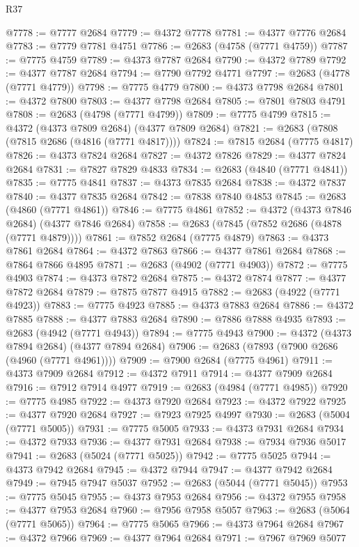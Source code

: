 \begin{lexlean}{R37}
\begin{coremodule}
@7778 := @7777 @2684
@7779 := @4372 @7778
@7781 := @4377 @7776 @2684
@7783 := @7779 @7781 @4751
@7786 := @2683 (@4758 (@7771 @4759))
@7787 := @7775 @4759
@7789 := @4373 @7787 @2684
@7790 := @4372 @7789
@7792 := @4377 @7787 @2684
@7794 := @7790 @7792 @4771
@7797 := @2683 (@4778 (@7771 @4779))
@7798 := @7775 @4779
@7800 := @4373 @7798 @2684
@7801 := @4372 @7800
@7803 := @4377 @7798 @2684
@7805 := @7801 @7803 @4791
@7808 := @2683 (@4798 (@7771 @4799))
@7809 := @7775 @4799
@7815 := @4372 (@4373 @7809 @2684) (@4377 @7809 @2684)
@7821 := @2683 (@7808 (@7815 @2686 (@4816 (@7771 @4817))))
@7824 := @7815 @2684 (@7775 @4817)
@7826 := @4373 @7824 @2684
@7827 := @4372 @7826
@7829 := @4377 @7824 @2684
@7831 := @7827 @7829 @4833
@7834 := @2683 (@4840 (@7771 @4841))
@7835 := @7775 @4841
@7837 := @4373 @7835 @2684
@7838 := @4372 @7837
@7840 := @4377 @7835 @2684
@7842 := @7838 @7840 @4853
@7845 := @2683 (@4860 (@7771 @4861))
@7846 := @7775 @4861
@7852 := @4372 (@4373 @7846 @2684) (@4377 @7846 @2684)
@7858 := @2683 (@7845 (@7852 @2686 (@4878 (@7771 @4879))))
@7861 := @7852 @2684 (@7775 @4879)
@7863 := @4373 @7861 @2684
@7864 := @4372 @7863
@7866 := @4377 @7861 @2684
@7868 := @7864 @7866 @4895
@7871 := @2683 (@4902 (@7771 @4903))
@7872 := @7775 @4903
@7874 := @4373 @7872 @2684
@7875 := @4372 @7874
@7877 := @4377 @7872 @2684
@7879 := @7875 @7877 @4915
@7882 := @2683 (@4922 (@7771 @4923))
@7883 := @7775 @4923
@7885 := @4373 @7883 @2684
@7886 := @4372 @7885
@7888 := @4377 @7883 @2684
@7890 := @7886 @7888 @4935
@7893 := @2683 (@4942 (@7771 @4943))
@7894 := @7775 @4943
@7900 := @4372 (@4373 @7894 @2684) (@4377 @7894 @2684)
@7906 := @2683 (@7893 (@7900 @2686 (@4960 (@7771 @4961))))
@7909 := @7900 @2684 (@7775 @4961)
@7911 := @4373 @7909 @2684
@7912 := @4372 @7911
@7914 := @4377 @7909 @2684
@7916 := @7912 @7914 @4977
@7919 := @2683 (@4984 (@7771 @4985))
@7920 := @7775 @4985
@7922 := @4373 @7920 @2684
@7923 := @4372 @7922
@7925 := @4377 @7920 @2684
@7927 := @7923 @7925 @4997
@7930 := @2683 (@5004 (@7771 @5005))
@7931 := @7775 @5005
@7933 := @4373 @7931 @2684
@7934 := @4372 @7933
@7936 := @4377 @7931 @2684
@7938 := @7934 @7936 @5017
@7941 := @2683 (@5024 (@7771 @5025))
@7942 := @7775 @5025
@7944 := @4373 @7942 @2684
@7945 := @4372 @7944
@7947 := @4377 @7942 @2684
@7949 := @7945 @7947 @5037
@7952 := @2683 (@5044 (@7771 @5045))
@7953 := @7775 @5045
@7955 := @4373 @7953 @2684
@7956 := @4372 @7955
@7958 := @4377 @7953 @2684
@7960 := @7956 @7958 @5057
@7963 := @2683 (@5064 (@7771 @5065))
@7964 := @7775 @5065
@7966 := @4373 @7964 @2684
@7967 := @4372 @7966
@7969 := @4377 @7964 @2684
@7971 := @7967 @7969 @5077

\end{coremodule}
\end{lexlean}
